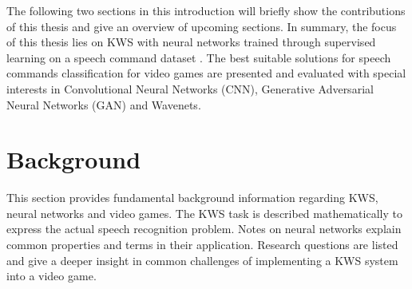 The following two sections in this introduction will briefly show the contributions of this thesis and give an overview of upcoming sections.
In summary, the focus of this thesis lies on KWS with neural networks trained through supervised learning on a speech command dataset \cite{Warden2018}.
The best suitable solutions for speech commands classification for video games are presented and evaluated with special interests in Convolutional Neural Networks (CNN), Generative Adversarial Neural Networks (GAN) and Wavenets.







\chapter{Background}\label{sec:back}
This section provides fundamental background information regarding KWS, neural networks and video games.
The KWS task is described mathematically to express the actual speech recognition problem.
Notes on neural networks explain common properties and terms in their application.
Research questions are listed and give a deeper insight in common challenges of implementing a KWS system into a video game.





